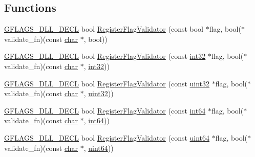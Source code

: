 \subsection*{Functions}
\begin{DoxyCompactItemize}
\item 
\hyperlink{gflags__declare_8h_ab630d48e0b993f39ca96b0c4401f01cf}{G\+F\+L\+A\+G\+S\+\_\+\+D\+L\+L\+\_\+\+D\+E\+CL} bool \hyperlink{namespaceGFLAGS__NAMESPACE_a9c82301dac83029d50b8deb4133afed4}{Register\+Flag\+Validator} (const bool $\ast$flag, bool($\ast$validate\+\_\+fn)(const \hyperlink{CMakeCache_8txt_afe71f11dacb15682cdc012f7208e6e09}{char} $\ast$, bool))
\item 
\hyperlink{gflags__declare_8h_ab630d48e0b993f39ca96b0c4401f01cf}{G\+F\+L\+A\+G\+S\+\_\+\+D\+L\+L\+\_\+\+D\+E\+CL} bool \hyperlink{namespaceGFLAGS__NAMESPACE_abce30e0f7e6056aef2a9405115b63d54}{Register\+Flag\+Validator} (const \hyperlink{namespaceGFLAGS__NAMESPACE_ab5e093ecf2996943821e773cdf22140a}{int32} $\ast$flag, bool($\ast$validate\+\_\+fn)(const \hyperlink{CMakeCache_8txt_afe71f11dacb15682cdc012f7208e6e09}{char} $\ast$, \hyperlink{namespaceGFLAGS__NAMESPACE_ab5e093ecf2996943821e773cdf22140a}{int32}))
\item 
\hyperlink{gflags__declare_8h_ab630d48e0b993f39ca96b0c4401f01cf}{G\+F\+L\+A\+G\+S\+\_\+\+D\+L\+L\+\_\+\+D\+E\+CL} bool \hyperlink{namespaceGFLAGS__NAMESPACE_a2ed34dcca8ee28d087e6aa414905e23c}{Register\+Flag\+Validator} (const \hyperlink{namespaceGFLAGS__NAMESPACE_a7cd152e31d8bd6ada6c1c79adeb5bd8c}{uint32} $\ast$flag, bool($\ast$validate\+\_\+fn)(const \hyperlink{CMakeCache_8txt_afe71f11dacb15682cdc012f7208e6e09}{char} $\ast$, \hyperlink{namespaceGFLAGS__NAMESPACE_a7cd152e31d8bd6ada6c1c79adeb5bd8c}{uint32}))
\item 
\hyperlink{gflags__declare_8h_ab630d48e0b993f39ca96b0c4401f01cf}{G\+F\+L\+A\+G\+S\+\_\+\+D\+L\+L\+\_\+\+D\+E\+CL} bool \hyperlink{namespaceGFLAGS__NAMESPACE_a279dca76b92be2bcb9b821f195d0d94d}{Register\+Flag\+Validator} (const \hyperlink{namespaceGFLAGS__NAMESPACE_aedc4fdd5cc24ffefc1a7d07a841e9798}{int64} $\ast$flag, bool($\ast$validate\+\_\+fn)(const \hyperlink{CMakeCache_8txt_afe71f11dacb15682cdc012f7208e6e09}{char} $\ast$, \hyperlink{namespaceGFLAGS__NAMESPACE_aedc4fdd5cc24ffefc1a7d07a841e9798}{int64}))
\item 
\hyperlink{gflags__declare_8h_ab630d48e0b993f39ca96b0c4401f01cf}{G\+F\+L\+A\+G\+S\+\_\+\+D\+L\+L\+\_\+\+D\+E\+CL} bool \hyperlink{namespaceGFLAGS__NAMESPACE_adc7c8e1b2db6f4ac4f79e41e9c3209ec}{Register\+Flag\+Validator} (const \hyperlink{namespaceGFLAGS__NAMESPACE_af2914c2ad1f9bf454f663ddcc5c934d5}{uint64} $\ast$flag, bool($\ast$validate\+\_\+fn)(const \hyperlink{CMakeCache_8txt_afe71f11dacb15682cdc012f7208e6e09}{char} $\ast$, \hyperlink{namespaceGFLAGS__NAMESPACE_af2914c2ad1f9bf454f663ddcc5c934d5}{uint64}))

\end{DoxyCompactItemize}
